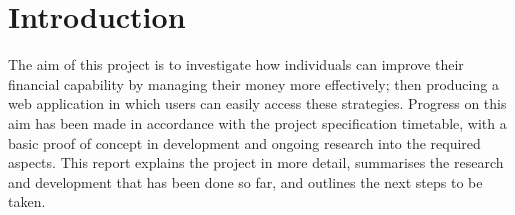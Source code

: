 \section{Introduction}

The aim of this project is to investigate how individuals can improve their financial capability by managing their money more effectively; then producing a web application in which users can easily access these strategies. Progress on this aim has been made in accordance with the project specification timetable, with a basic proof of concept in development and ongoing research into the required aspects. This report explains the project in more detail, summarises the research and development that has been done so far, and outlines the next steps to be taken.
